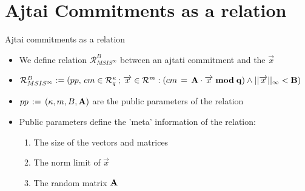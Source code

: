 \section{Ajtai Commitments as a relation}
\begin{frame}{Ajtai commitments as a relation}
    \begin{itemize}
        \item We define relation $\mathcal{R}^B_{MSIS^{\infty}}$ between an ajtati commitment and the $\overrightarrow{x}$
        \item $\mathcal{R}^B_{MSIS^{\infty}} := {(pp, \, cm \in \mathcal{R}^{\kappa}_q\, ;\, \overrightarrow{x} \in \mathcal{R}^m : (cm\, =\, \bf{A}\cdot \overrightarrow{x} \; mod \; q) \land ||\overrightarrow{x}||_{\infty} < B  )}$
        \item $pp\,:=\, (\kappa, m, B, \bf{A})$ are the public parameters of the relation
        \item Public parameters define the 'meta' information of the relation:
              \begin{enumerate}
                  \item The size of the vectors and matrices
                  \item The norm limit of $\overrightarrow{x}$
                  \item The random matrix $\bf{A}$

              \end{enumerate}
    \end{itemize}
\end{frame}
